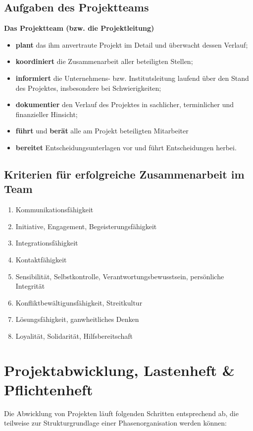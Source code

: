 \documentclass[11pt,a4paper]{article}
\begin{document}
\subsection{Aufgaben des Projektteams}
\textbf{Das Projektteam (bzw. die Projektleitung)}

\begin{itemize}
\item \textbf{plant} das ihm anvertraute Projekt im Detail und überwacht dessen Verlauf;
\item \textbf{koordiniert} die Zusammenarbeit aller beteiligten Stellen;
\item \textbf{informiert} die Unternehmens- bzw. Institutsleitung laufend über den Stand
des Projektes, insbesondere bei Schwierigkeiten;
\item \textbf{dokumentier} den Verlauf des Projektes in sachlicher, terminlicher und
finanzieller Hinsicht;
\item \textbf{führt} und \textbf{berät} alle am Projekt beteiligten Mitarbeiter
\item \textbf{bereitet} Entscheidungsunterlagen vor und führt Entscheidungen herbei.
\end{itemize}

\subsection{Kriterien für erfolgreiche Zusammenarbeit im Team}
\begin{enumerate}
\item Kommunikationsfähigkeit
\item Initiative, Engagement, Begeisterungsfähigkeit
\item Integrationsfähigkeit
\item Kontaktfähigkeit
\item Sensibilität, Selbstkontrolle, Verantwortungsbewusstsein, persönliche Integrität
\item Konfliktbewältigunsfähigkeit, Streitkultur
\item Lösungsfähigkeit, ganwheitliches Denken
\item Loyalität, Solidarität, Hilfsbereitschaft
\end{enumerate}

\section{Projektabwicklung, Lastenheft \& Pflichtenheft}

Die Abwicklung von Projekten läuft folgenden Schritten entsprechend ab,
die teilweise zur Strukturgrundlage einer Phasenorganisation werden können:
\end{document}
